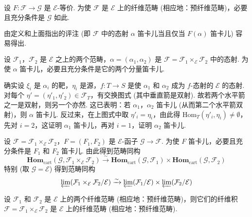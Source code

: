 \begin{proposition}\label{prop:VI.6.2}
设 $F \colon \mathcal{F} \to \mathcal{G}$ 是 $\mathcal{E}$-等价. 为使 $\mathcal{F}$ 是 $\mathcal{E}$ 上的纤维范畴 (相应地：预纤维范畴)，必要且充分条件是 $\mathcal{G}$ 如此.
\end{proposition}

由定义和上面指出的评注 (即 $\mathcal{F}$ 中的态射 $\alpha$ 笛卡儿当且仅当 $F(\alpha)$ 笛卡儿) 容易得出.

\begin{proposition}\label{prop:VI.6.3}
设 $\mathcal{F}_1$，$\mathcal{F}_2$ 是 $\mathcal{E}$ 之上的两个范畴，$\alpha = (\alpha_1, \alpha_2)$ 是 $\mathcal{F} = \mathcal{F}_1 \times_{\mathcal{E}} \mathcal{F}_2$ 中的态射. 为使 $\alpha$ 笛卡儿，必要且充分条件是它的两个分量笛卡儿.
\end{proposition}

确实设 $\xi_i$ 是 $\alpha_i$ 的靶，$\eta_i$ 是源，$f \colon T \to S$ 是使 $\alpha_1$ 和 $\alpha_2$ 成为 $f$-态射的 $\mathcal{E}$ 的态射. 对每个 $\eta' = (\eta'_1, \eta'_2) \in \mathcal{F}_T$，有交换图式 (其中垂直箭是双射). 故若两个水平箭之一是双射，则另一个亦然. 这已表明：若 $\alpha_1$，$\alpha_2$ 笛卡儿 (从而第二个水平箭双射)，则 $\alpha$ 笛卡儿. 反过来，在上图式中取 $\eta'_i = \eta_i$，由此得 Hom$_T(\eta'_i, \eta_i) \neq \emptyset$，先对 $i = 2$，这证明 $\alpha_1$ 笛卡儿，再对 $i = 1$，证明 $\alpha_2$ 笛卡儿.

\begin{corollary}\label{cor:VI.6.4}
设 $\mathcal{F} = \mathcal{F}_1 \times_{\mathcal{E}} \mathcal{F}_2$，$F = (F_1, F_2)$ 是 $\mathcal{E}$-函子 $\mathcal{G} \to \mathcal{F}$. 为使 $F$ 笛卡儿，必要且充分条件是 $F_1$ 和 $F_2$ 笛卡儿. 由此得到范畴同构
\[
\mathbf{Hom}_{\mathrm{cart}}(\mathcal{G}, \mathcal{F}_1 \times_{\mathcal{E}} \mathcal{F}_2) \xrightarrow{\sim} \mathbf{Hom}_{\mathrm{cart}}(\mathcal{G}, \mathcal{F}_1) \times \mathbf{Hom}_{\mathrm{cart}}(\mathcal{G}, \mathcal{F}_2)
\]
特别 (取 $\mathcal{G} = \mathcal{E}$) 得到范畴同构
\[
\varprojlim (\mathcal{F}_1 \times_{\mathcal{E}} \mathcal{F}_2/\mathcal{E}) \xrightarrow{\sim} \varprojlim (\mathcal{F}_1/\mathcal{E}) \times \varprojlim (\mathcal{F}_2/\mathcal{E})
\]
\end{corollary}

\begin{corollary}\label{cor:VI.6.5}
设 $\mathcal{F}_1$ 和 $\mathcal{F}_2$ 是 $\mathcal{E}$ 上的两个纤维范畴 (相应地：预纤维范畴)，则它们的纤维积 $\mathcal{F} = \mathcal{F}_1 \times_{\mathcal{E}} \mathcal{F}_2$ 是 $\mathcal{E}$ 上的纤维范畴 (相应地：预纤维范畴).
\end{corollary}

